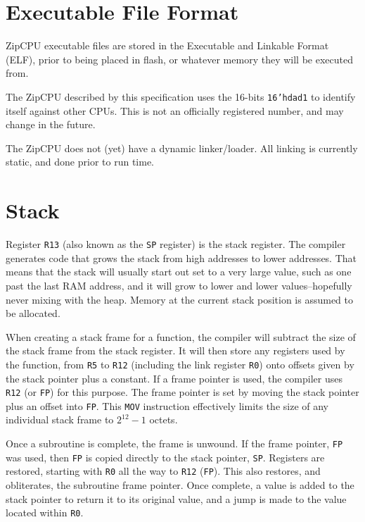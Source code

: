 \documentclass{gqtekspec}
\begin{document}
\section{Executable File Format}\label{sec:abi-elf}
ZipCPU executable files are stored in the Executable and Linkable Format
(ELF), prior to being placed in flash, or whatever memory they will be
executed from.  

The ZipCPU described by this specification uses the 16-bits {\tt 16'hdad1}
to identify itself against other CPUs.  This is not an officially registered
number, and may change in the future.

The ZipCPU does not (yet) have a dynamic linker/loader.  All linking is
currently static, and done prior to run time.

\section{Stack}\label{sec:abi-stack}
Register {\tt R13} (also known as the {\tt SP} register) is the stack register.
The compiler generates code that grows the stack from
high addresses to lower addresses.  That means that the stack will usually
start out set to a very large value, such as one past the last RAM address,
and it will grow to lower and lower values--hopefully never mixing with the
heap.  Memory at the current stack position is assumed to be allocated.

When creating a stack frame for a function, the compiler will subtract
the size of the stack frame from the stack register.  It will then store
any registers used by the function, from {\tt R5} to {\tt R12} (including
the link register {\tt R0}) onto offsets given by the stack pointer plus a 
constant.  If a frame pointer is used, the compiler uses {\tt R12} (or
{\tt FP}) for this purpose.  The frame pointer is set by moving the stack
pointer plus an offset into {\tt FP}.  This {\tt MOV} instruction effectively
limits the size of any individual stack frame to $2^{12}-1$ octets.

Once a subroutine is complete, the frame is unwound.  If the frame pointer,
{\tt FP} was used, then {\tt FP} is copied directly to the stack pointer,
{\tt SP}.  Registers are restored, starting with {\tt R0} all the way to
{\tt R12} ({\tt FP}).  This also restores, and obliterates, the subroutine
frame pointer.  Once complete, a value is added to the stack pointer to
return it to its original value, and a jump is made to the value located
within {\tt R0}.
\end{document}
